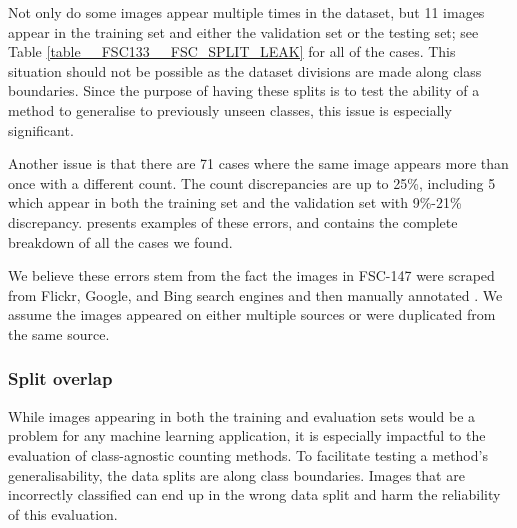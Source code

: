 \documentclass[../thesis.tex]{subfiles}
\begin{document}
Not only do some images appear multiple times in the dataset, but 11 images appear in the training set and either the validation set or the testing set; see Table \ref{table__FSC133__FSC_SPLIT_LEAK} for all of the cases. This situation should not be possible as the dataset divisions are made along class boundaries.
Since the purpose of having these splits is to test the ability of a method to generalise to previously unseen classes, this issue is especially significant.

\begin{table}
    \centering
    \resizebox{\textwidth}{!}{%
    
    }
        \caption{The 17 cases where the same image appears in more than one of the training, validation, or test sets. The right column denotes which of these images (or if a third image) appears in FSC-133.}
    \label{table__FSC133__FSC_SPLIT_LEAK}
\end{table}



Another issue is that there are 71 cases where the same image appears more than once with a different count.
The count discrepancies are up to 25\%, including 5 which appear in both the training set and the validation set with 9\%-21\% discrepancy.
 presents examples of these errors, and  contains the complete breakdown of all the cases we found.


\begin{table}
    \centering
    \fontsize{9}{9}\selectfont   
    \resizebox{0.9\textwidth}{!}{%
    
    }
     \caption{The 71 cases where the same image appears more than once in FSC-147 with different associated counts. The right column denotes which of these images (or, in some cases a third image) appears in FSC-133.}
    \label{table__FSC133__FSC_COUNT_DIFF}
\end{table}


We believe these errors stem from the fact the images in FSC-147 were scraped from Flickr, Google, and Bing search engines and then manually annotated \cite{ranjan2021Famnet}. 
We assume the images appeared on either multiple sources or were duplicated from the same source. 


\subsubsection{Split overlap}
While images appearing in both the training and evaluation sets would be a problem for any machine learning application, it is especially impactful to the evaluation of class-agnostic counting methods.
To facilitate testing a method's generalisability, the data splits are along class boundaries.
Images that are incorrectly classified can end up in the wrong data split and harm the reliability of this evaluation. 
\end{document}
